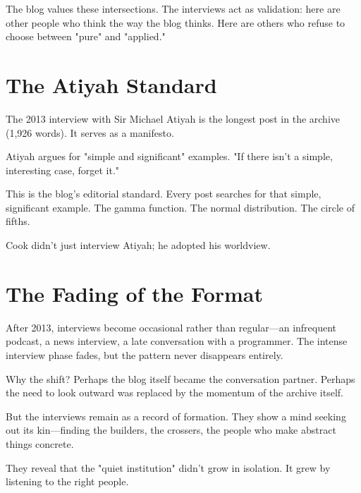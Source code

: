 The blog values these intersections. The interviews act as validation: here are other people who think the way the blog thinks. Here are others who refuse to choose between "pure" and "applied."

\bigskip

\section*{The Atiyah Standard}

The 2013 interview with Sir Michael Atiyah is the longest post in the archive (1,926 words). It serves as a manifesto.

Atiyah argues for "simple and significant" examples. "If there isn't a simple, interesting case, forget it."

This is the blog's editorial standard. Every post searches for that simple, significant example. The gamma function. The normal distribution. The circle of fifths.

Cook didn't just interview Atiyah; he adopted his worldview.

\bigskip

\section*{The Fading of the Format}

After 2013, interviews become occasional rather than regular—an infrequent podcast, a news interview, a late conversation with a programmer. The intense interview phase fades, but the pattern never disappears entirely.

Why the shift? Perhaps the blog itself became the conversation partner. Perhaps the need to look outward was replaced by the momentum of the archive itself.

But the interviews remain as a record of formation. They show a mind seeking out its kin—finding the builders, the crossers, the people who make abstract things concrete.

They reveal that the "quiet institution" didn't grow in isolation. It grew by listening to the right people.
